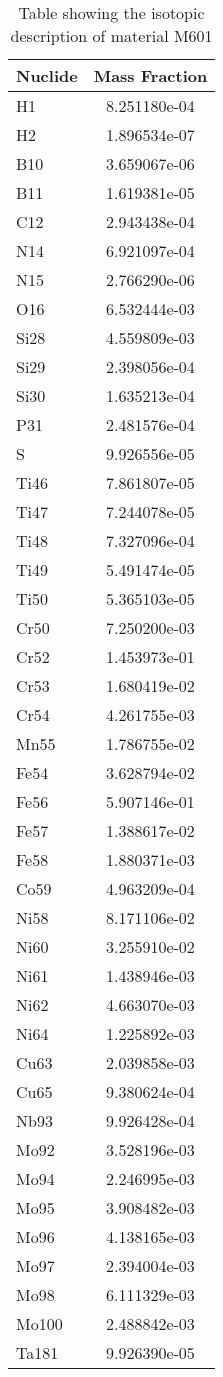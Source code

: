 \begin{centering}
\begin{table}[ht!]
\begin{tabular}{l | c}
\hline
Nuclide & Mass Fraction\\
\hline
H1 & 8.251180e-04\\
H2 & 1.896534e-07\\
B10 & 3.659067e-06\\
B11 & 1.619381e-05\\
C12 & 2.943438e-04\\
N14 & 6.921097e-04\\
N15 & 2.766290e-06\\
O16 & 6.532444e-03\\
Si28 & 4.559809e-03\\
Si29 & 2.398056e-04\\
Si30 & 1.635213e-04\\
P31 & 2.481576e-04\\
S & 9.926556e-05\\
Ti46 & 7.861807e-05\\
Ti47 & 7.244078e-05\\
Ti48 & 7.327096e-04\\
Ti49 & 5.491474e-05\\
Ti50 & 5.365103e-05\\
Cr50 & 7.250200e-03\\
Cr52 & 1.453973e-01\\
Cr53 & 1.680419e-02\\
Cr54 & 4.261755e-03\\
Mn55 & 1.786755e-02\\
Fe54 & 3.628794e-02\\
Fe56 & 5.907146e-01\\
Fe57 & 1.388617e-02\\
Fe58 & 1.880371e-03\\
Co59 & 4.963209e-04\\
Ni58 & 8.171106e-02\\
Ni60 & 3.255910e-02\\
Ni61 & 1.438946e-03\\
Ni62 & 4.663070e-03\\
Ni64 & 1.225892e-03\\
Cu63 & 2.039858e-03\\
Cu65 & 9.380624e-04\\
Nb93 & 9.926428e-04\\
Mo92 & 3.528196e-03\\
Mo94 & 2.246995e-03\\
Mo95 & 3.908482e-03\\
Mo96 & 4.138165e-03\\
Mo97 & 2.394004e-03\\
Mo98 & 6.111329e-03\\
Mo100 & 2.488842e-03\\
Ta181 & 9.926390e-05
\end{tabular}
\caption{Table showing the isotopic description of material M601}
\label{table:material_M601}
\end{table}\clearpage


\end{centering}
